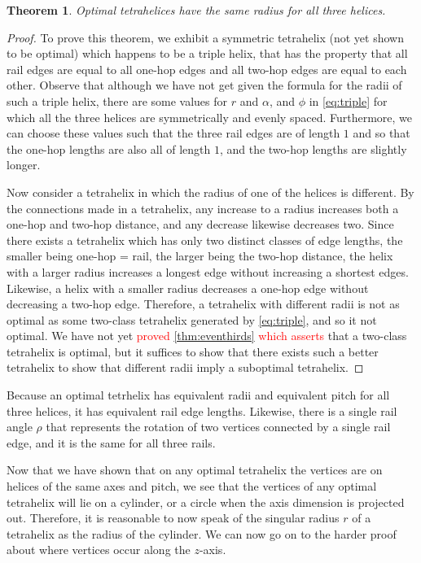 \documentclass[twocolumn,10pt]{asme2ej}
\newtheorem{theorem}{Theorem}
\newcommand{\highlighttext}[1] {\textcolor{red}{#1}}
\begin{document}
\begin{theorem}
  Optimal tetrahelices have the same radius for all three helices.
\end{theorem}
\begin{proof}
To prove this theorem, we exhibit a symmetric tetrahelix (not yet shown to be optimal) which
happens to be a triple helix, that has
the property that all rail edges are equal to all one-hop edges and all two-hop
edges are equal to each other. 
Observe that although we have not get given the formula for the
radii of such a triple helix, there are some values for $r$ and $\alpha$, and $\phi$
in \cref{eq:triple}
for which all the three helices are symmetrically and evenly spaced. Furthermore,
we can choose these values such that the three rail edges are of length $1$ and
so that the one-hop lengths are also all of length $1$, and the two-hop lengths
are slightly longer.

Now consider a tetrahelix in which the radius of one of the helices is different.
By the connections made in a tetrahelix, any increase to a radius increases both
a one-hop and two-hop distance, and any decrease likewise decreases two.
Since there exists a tetrahelix which has only two distinct classes of edge lengths,
the smaller being one-hop = rail, the larger being the two-hop distance, the helix
with a larger radius increases a longest edge without increasing a shortest edges.
Likewise, a helix with a smaller radius decreases a one-hop edge without decreasing
a two-hop edge.  Therefore, a tetrahelix with different radii is not as optimal as some two-class 
tetrahelix generated by \cref{eq:triple}, and so it not optimal. We have not yet
\highlighttext{proved \cref{thm:eventhirds} which asserts} that a two-class tetrahelix is optimal, but it suffices to show that there
exists such a better tetrahelix to show that different radii imply a suboptimal
tetrahelix.
\end{proof}

Because an optimal tetrhelix has equivalent radii and equivalent pitch for all three helices,
it has equivalent rail edge lengths. Likewise, there is a single rail angle $\rho$ that
represents the rotation of two vertices connected by a single rail edge, and it is the same
for all three rails.

Now that we have shown that on any optimal tetrahelix the vertices
are on helices of the same axes and pitch, we see that the vertices 
of any optimal tetrahelix will lie on a cylinder, or a circle when the axis dimension
is projected out. Therefore, it is reasonable to now speak of the singular radius $r$
of a tetrahelix as the radius of the cylinder.
We can now go on to
the harder proof about where vertices occur along the $z$-axis.
\end{document}
